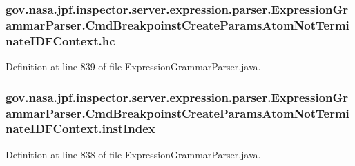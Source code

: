 \subsubsection[{\texorpdfstring{hc}{hc}}]{ gov.\+nasa.\+jpf.\+inspector.\+server.\+expression.\+parser.\+Expression\+Grammar\+Parser.\+Cmd\+Breakpoinst\+Create\+Params\+Atom\+Not\+Terminate\+I\+D\+F\+Context.\+hc}\hypertarget{classgov_1_1nasa_1_1jpf_1_1inspector_1_1server_1_1expression_1_1parser_1_1_expression_grammar_paee196826319d0ea00470866a7ffd8d7b_a3d28a7a20390a05c37d1bf8443ce98ec}{}\label{classgov_1_1nasa_1_1jpf_1_1inspector_1_1server_1_1expression_1_1parser_1_1_expression_grammar_paee196826319d0ea00470866a7ffd8d7b_a3d28a7a20390a05c37d1bf8443ce98ec}


Definition at line 839 of file Expression\+Grammar\+Parser.\+java.

\subsubsection[{\texorpdfstring{inst\+Index}{instIndex}}]{ gov.\+nasa.\+jpf.\+inspector.\+server.\+expression.\+parser.\+Expression\+Grammar\+Parser.\+Cmd\+Breakpoinst\+Create\+Params\+Atom\+Not\+Terminate\+I\+D\+F\+Context.\+inst\+Index}\hypertarget{classgov_1_1nasa_1_1jpf_1_1inspector_1_1server_1_1expression_1_1parser_1_1_expression_grammar_paee196826319d0ea00470866a7ffd8d7b_ae3f4439c95fc311dcaa797c66713802d}{}\label{classgov_1_1nasa_1_1jpf_1_1inspector_1_1server_1_1expression_1_1parser_1_1_expression_grammar_paee196826319d0ea00470866a7ffd8d7b_ae3f4439c95fc311dcaa797c66713802d}


Definition at line 838 of file Expression\+Grammar\+Parser.\+java.

